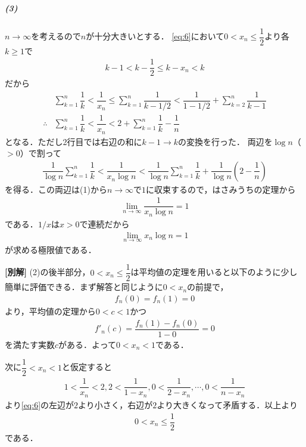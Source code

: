 \documentclass[../../main.tex]{subfiles}
\begin{document}
\subparagraph{(3)}
$n\to\infty$を考えるので$n$が十分大きいとする．
\cref{eq:6}において$0<x_n\le \dfrac{1}{2}$より各$k\ge1$で
\begin{align}
  k - 1 < k-\dfrac{1}{2}\le k-x_n <  k
\end{align}
だから
\begin{align}
  & \sum_{k=1}^n\dfrac{1}{k}<\dfrac{1}{x_n} \le \sum_{k=1}^n\dfrac{1}{k-1/2} < \dfrac{1}{1-1/2} + \sum_{k=2}^n\dfrac{1}{k-1} \\
  \therefore
  & \sum_{k=1}^n\dfrac{1}{k}<\dfrac{1}{x_n} < 2 + \sum_{k=1}^n\dfrac{1}{k} - \dfrac{1}{n}
\end{align}
となる．ただし2行目では右辺の和に$k-1\to k$の変換を行った．
両辺を$\log n$（$>0$）で割って
\begin{align}
  \dfrac{1}{\log n}\sum_{k=1}^n\dfrac{1}{k}<\dfrac{1}{x_n\log n}<\dfrac{1}{\log n}\sum_{k=1}^n\dfrac{1}{k}+\dfrac{1}{\log n}\left(2-\dfrac{1}{n}\right)
\end{align}
を得る．この両辺は(1)から$n\to\infty$で$1$に収束するので，はさみうちの定理から
\begin{align}
  \lim_{n\to\infty} \dfrac{1}{x_n\log n} = 1
\end{align}
である．$1/x$は$x>0$で連続だから
\begin{align}
  \lim_{n\to\infty} x_n\log n = 1
\end{align}
が求める極限値である．

{\bf [別解]}
(2)の後半部分，$0<x_n\le\dfrac{1}{2}$は平均値の定理を用いると以下のように少し簡単に評価できる．まず解答と同じように$0<x_n$の前提で，
\begin{align}
  f_n(0) = f_n(1) = 0
\end{align}
より，平均値の定理から$0<c<1$かつ
\begin{align}
  f'_n(c) = \dfrac{f_n(1)-f_n(0)}{1-0} = 0
\end{align}
を満たす実数$c$がある．よって$0<x_n<1$である．

次に$\dfrac{1}{2}<x_n<1$と仮定すると
\begin{align}
  1<\dfrac{1}{x_n}<2, 2<\dfrac{1}{1-x_n}, 0<\dfrac{1}{2-x_n}, \cdots, 0<\dfrac{1}{n-x_n}
\end{align}
より\cref{eq:6}の左辺が$2$より小さく，右辺が$2$より大きくなって矛盾する．以上より
\begin{align}
  0 < x_n \le \dfrac{1}{2}
\end{align}
である．
\end{document}
